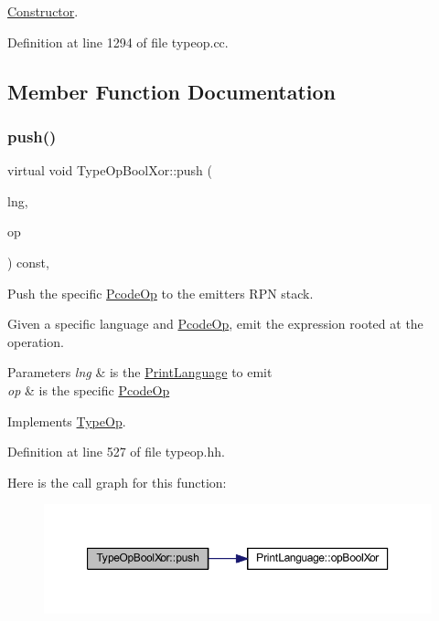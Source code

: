 \mbox{\hyperlink{class_constructor}{Constructor}}. 



Definition at line 1294 of file typeop.\+cc.



\subsection{Member Function Documentation}
\mbox{\label{class_type_op_bool_xor_aa7ca8fb7cb1661f9eee1103ced69b3ad}} 
\subsubsection{\texorpdfstring{push()}{push()}}
{\footnotesize\ttfamily virtual void Type\+Op\+Bool\+Xor\+::push (\begin{DoxyParamCaption}\item[{\mbox{\hyperlink{class_print_language}{Print\+Language}} $\ast$}]{lng,  }\item[{const \mbox{\hyperlink{class_pcode_op}{Pcode\+Op}} $\ast$}]{op }\end{DoxyParamCaption}) const\hspace{0.3cm}{\ttfamily [inline]}, {\ttfamily [virtual]}}



Push the specific \mbox{\hyperlink{class_pcode_op}{Pcode\+Op}} to the emitter\textquotesingle{}s R\+PN stack. 

Given a specific language and \mbox{\hyperlink{class_pcode_op}{Pcode\+Op}}, emit the expression rooted at the operation. 
\begin{DoxyParams}{Parameters}
{\em lng} & is the \mbox{\hyperlink{class_print_language}{Print\+Language}} to emit \\
\hline
{\em op} & is the specific \mbox{\hyperlink{class_pcode_op}{Pcode\+Op}} \\
\hline
\end{DoxyParams}


Implements \mbox{\hyperlink{class_type_op_ac9c9544203ed74dabe6ac662b653b2af}{Type\+Op}}.



Definition at line 527 of file typeop.\+hh.

Here is the call graph for this function\+:
\nopagebreak
\begin{figure}[H]
\begin{center}
\leavevmode
\includegraphics[width=350pt]{class_type_op_bool_xor_aa7ca8fb7cb1661f9eee1103ced69b3ad_cgraph}
\end{center}
\end{figure}


